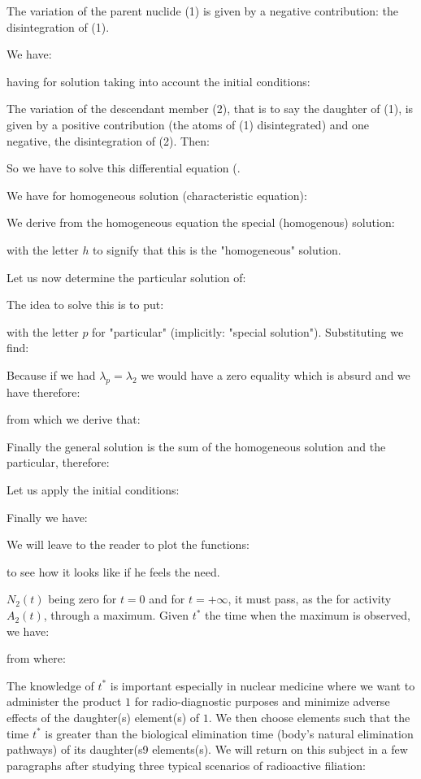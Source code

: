 	The variation of the parent nuclide (1) is given by a negative contribution: the disintegration of (1).

	We have:
	
	having for solution taking into account the initial conditions:
	
	
	The variation of the descendant member (2), that is to say the daughter of (1), is given by a positive contribution (the atoms of (1) disintegrated) and one negative, the disintegration of (2). Then:
	
	So we have to solve this differential equation (.
	
	We have for homogeneous solution (characteristic equation):
	
	We derive from the homogeneous equation the special (homogenous) solution:
	
	with the letter $h$ to signify that this is the "homogeneous" solution.

	Let us now determine the particular solution of:
	
	The idea to solve this is to put:
	
	with the letter $p$ for "particular" (implicitly: "special solution"). Substituting we find:
	
	Because if we had $\lambda_p=\lambda_2$ we would have a zero equality which is absurd and we have therefore:
	
	from which we derive that:
	
	Finally the general solution is the sum of the homogeneous solution and the particular, therefore:
	
	Let us apply the initial conditions:
	
	Finally we have:
	
	We will leave to the reader to plot the functions:
	
	to see how it looks like if he feels the need.
	
	$N_2(t)$ being zero for $t=0$ and for $t=+\infty$, it must pass, as the for activity $A_2(t)$, through a maximum. Given $t^{*}$ the time when the maximum is observed, we have:
	
	from where:
	
	The knowledge of $t^{*}$ is important especially in nuclear medicine where we want to administer the product $1$ for radio-diagnostic purposes  and minimize adverse effects of the daughter(s) element(s) of $1$. We then choose elements such that the time $t^{*}$ is greater than the biological elimination time (body's natural elimination pathways) of its daughter(s9 elements(s). We will return on this subject in a few paragraphs after studying three typical scenarios of radioactive filiation:
	
